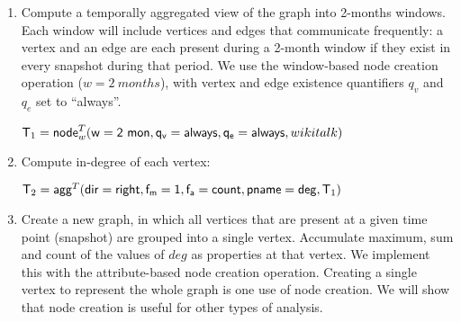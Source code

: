 \begin{enumerate}[noitemsep,,itemindent=\dimexpr\labelwidth+\labelsep\relax,leftmargin=0pt]
\item Compute a temporally aggregated view of the graph into 2-months
  windows.  Each window will include vertices and edges that
  communicate frequently: a vertex and an edge are each present during
  a 2-month window if they exist in every snapshot during that period.
  We use the window-based node creation operation ($w=2~months$), with
  vertex and edge existence quantifiers $q_v$ and $q_e$ set to
  ``always''.


\begin{center}
$\mathsf{T}_1 = \textsf{node}^T_w(\mathsf{w=2~mon},\mathsf{q_v=always},\mathsf{q_e=always},wikitalk)$
\end{center}

\item Compute in-degree of each vertex:

\begin{center}
$\mathsf{T}_2 = \textsf{agg}^T(\mathsf{dir=right},\mathsf{f_m=1},\mathsf{f_a=count},\mathsf{pname=deg},\mathsf{T}_1)$
\end{center}

\item Create a new graph, in which all vertices that are present at a
  given time point (snapshot) are grouped into a single vertex.
  Accumulate maximum, sum and count of the values of $deg$ as
  properties at that vertex.  We implement this with the
  attribute-based node creation operation.  Creating a single vertex
  to represent the whole graph is one use of node creation.  We will
  show that node creation is useful for other types of analysis.


\end{enumerate}
